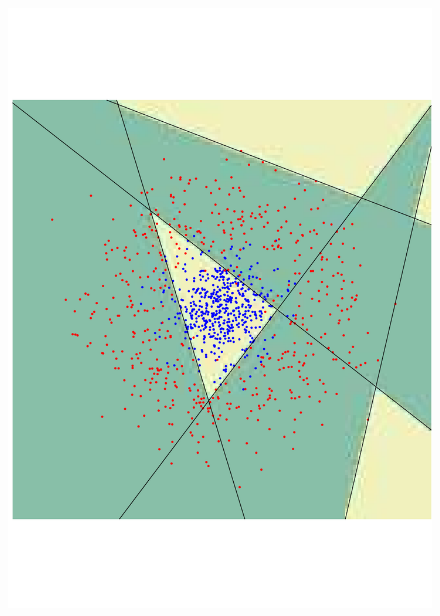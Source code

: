 \begin{figure}
\begin{center}
 \includegraphics[angle=270, scale=0.166]{ch4/figures/85.pdf}

\end{center}
\end{figure}
